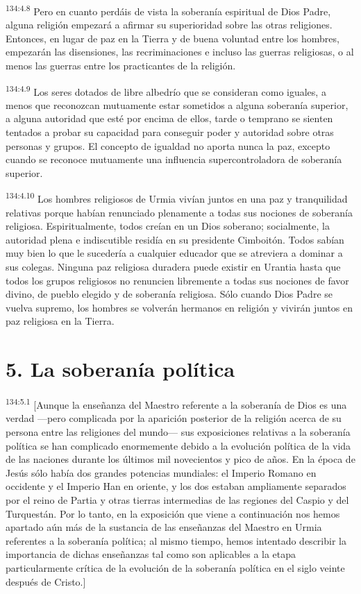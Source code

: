 \par 
\textsuperscript{134:4.8} Pero en cuanto perdáis de vista la soberanía espiritual de Dios Padre, alguna religión empezará a afirmar su superioridad sobre las otras religiones. Entonces, en lugar de paz en la Tierra y de buena voluntad entre los hombres, empezarán las disensiones, las recriminaciones e incluso las guerras religiosas, o al menos las guerras entre los practicantes de la religión.

\par 
\textsuperscript{134:4.9} Los seres dotados de libre albedrío que se consideran como iguales, a menos que reconozcan mutuamente estar sometidos a alguna soberanía superior, a alguna autoridad que esté por encima de ellos, tarde o temprano se sienten tentados a probar su capacidad para conseguir poder y autoridad sobre otras personas y grupos. El concepto de igualdad no aporta nunca la paz, excepto cuando se reconoce mutuamente una influencia supercontroladora de soberanía superior.

\par 
\textsuperscript{134:4.10} Los hombres religiosos de Urmia vivían juntos en una paz y tranquilidad relativas porque habían renunciado plenamente a todas sus nociones de soberanía religiosa. Espiritualmente, todos creían en un Dios soberano; socialmente, la autoridad plena e indiscutible residía en su presidente Cimboitón. Todos sabían muy bien lo que le sucedería a cualquier educador que se atreviera a dominar a sus colegas. Ninguna paz religiosa duradera puede existir en Urantia hasta que todos los grupos religiosos no renuncien libremente a todas sus nociones de favor divino, de pueblo elegido y de soberanía religiosa. Sólo cuando Dios Padre se vuelva supremo, los hombres se volverán hermanos en religión y vivirán juntos en paz religiosa en la Tierra.

\section*{5. La soberanía política}
\par 
\textsuperscript{134:5.1} [Aunque la enseñanza del Maestro referente a la soberanía de Dios es una verdad ---pero complicada por la aparición posterior de la religión acerca de su persona entre las religiones del mundo--- sus exposiciones relativas a la soberanía política se han complicado enormemente debido a la evolución política de la vida de las naciones durante los últimos mil novecientos y pico de años. En la época de Jesús sólo había dos grandes potencias mundiales: el Imperio Romano en occidente y el Imperio Han en oriente, y los dos estaban ampliamente separados por el reino de Partia y otras tierras intermedias de las regiones del Caspio y del Turquestán. Por lo tanto, en la exposición que viene a continuación nos hemos apartado aún más de la sustancia de las enseñanzas del Maestro en Urmia referentes a la soberanía política; al mismo tiempo, hemos intentado describir la importancia de dichas enseñanzas tal como son aplicables a la etapa particularmente crítica de la evolución de la soberanía política en el siglo veinte después de Cristo.]

